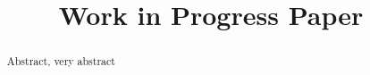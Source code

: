 \documentclass{llncs}
\begin{document}
\title{Work in Progress Paper}
\author{}
\maketitle
\begin{abstract}
Abstract, very abstract
\end{abstract}






 
 


\end{document}
